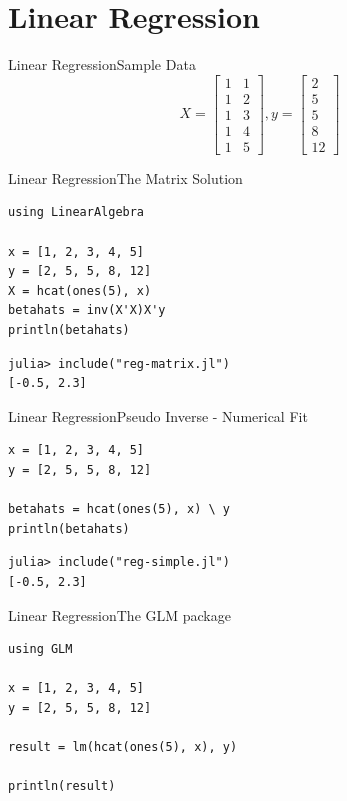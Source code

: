 \documentclass[11pt]{beamer}
\begin{document}
\section{Linear Regression}
\begin{frame}[fragile]{Linear Regression}{Sample Data}
\begin{equation}
X = \begin{bmatrix}
	1 & 1 \\
	1 & 2 \\
	1 & 3 \\
	1 & 4 \\
	1 & 5 
\end{bmatrix}, y = \begin{bmatrix}
2 \\
5 \\ 
5 \\ 
8 \\ 
12
\end{bmatrix}
\end{equation}
\end{frame}


\begin{frame}[fragile]{Linear Regression}{The Matrix Solution}
\begin{lstlisting}
using LinearAlgebra
		
x = [1, 2, 3, 4, 5]
y = [2, 5, 5, 8, 12]
X = hcat(ones(5), x)
betahats = inv(X'X)X'y
println(betahats)
\end{lstlisting}
	
\begin{lstlisting}
julia> include("reg-matrix.jl")
[-0.5, 2.3]
\end{lstlisting}
\end{frame}


\begin{frame}[fragile]{Linear Regression}{Pseudo Inverse - Numerical Fit}
\begin{lstlisting}
x = [1, 2, 3, 4, 5]
y = [2, 5, 5, 8, 12]

betahats = hcat(ones(5), x) \ y 
println(betahats)	
\end{lstlisting}

\begin{lstlisting}
julia> include("reg-simple.jl")
[-0.5, 2.3]
\end{lstlisting}
\end{frame}


\begin{frame}[fragile]{Linear Regression}{The GLM package}
\begin{lstlisting}
using GLM 

x = [1, 2, 3, 4, 5]
y = [2, 5, 5, 8, 12]

result = lm(hcat(ones(5), x), y)

println(result)

\end{lstlisting}
\end{frame}
\end{document}
